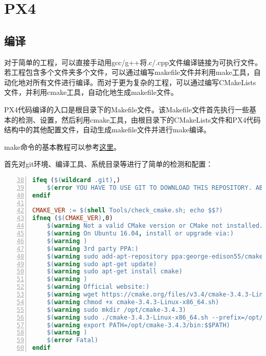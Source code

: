 \chapter{PX4}
\section{编译}
对于简单的工程，可以直接手动用gcc/g++将.c/.cpp文件编译链接为可执行文件。若工程包含多个文件夹多个文件，可以通过编写makefile文件并利用make工具，自动化地对所有文件进行编译。而对于更为复杂的工程，可以通过编写CMakeLists文件，并利用cmake工具，自动化地生成makefile文件。

PX4代码编译的入口是根目录下的Makefile文件。该Makefile文件首先执行一些基本的检测、设置，然后利用cmake工具，由根目录下的CMakeLists文件和PX4代码结构中的其他配置文件，自动生成makefile文件并进行make编译。

make命令的基本教程可以参考\href{http://www.ruanyifeng.com/blog/2015/02/make.html}{这里}。

首先对git环境、编译工具、系统目录等进行了简单的检测和配置：
\begin{lstlisting}[language=make,numbers=left,firstnumber = 38,numberstyle=\tiny,breaklines = true,keywordstyle=\color{blue!70},commentstyle=\color{red!50!green!50!blue!50},frame=shadowbox, rulesepcolor=\color{red!20!green!20!blue!20}]
	ifeq ($(wildcard .git),)
    $(error YOU HAVE TO USE GIT TO DOWNLOAD THIS REPOSITORY. ABORTING.)
endif

CMAKE_VER := $(shell Tools/check_cmake.sh; echo $$?)
ifneq ($(CMAKE_VER),0)
    $(warning Not a valid CMake version or CMake not installed.)
    $(warning On Ubuntu 16.04, install or upgrade via:)
    $(warning )
    $(warning 3rd party PPA:)
    $(warning sudo add-apt-repository ppa:george-edison55/cmake-3.x -y)
    $(warning sudo apt-get update)
    $(warning sudo apt-get install cmake)
    $(warning )
    $(warning Official website:)
    $(warning wget https://cmake.org/files/v3.4/cmake-3.4.3-Linux-x86_64.sh)
    $(warning chmod +x cmake-3.4.3-Linux-x86_64.sh)
    $(warning sudo mkdir /opt/cmake-3.4.3)
    $(warning sudo ./cmake-3.4.3-Linux-x86_64.sh --prefix=/opt/cmake-3.4.3 --exclude-subdir)
    $(warning export PATH=/opt/cmake-3.4.3/bin:$$PATH)
    $(warning )
    $(error Fatal)
endif
\end{lstlisting}

